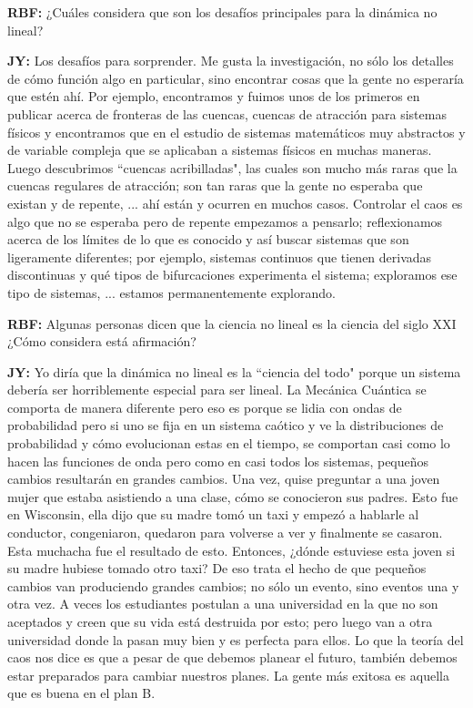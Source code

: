 \documentclass{rbf}
\newcommand{\mr}{{\bf RBF: }}
\newcommand{\jim}{{\bf JY: }}
\begin{document}
\mr ¿Cuáles considera que son los desafíos principales para la dinámica no lineal?

\jim Los desafíos para sorprender. Me gusta la investigación, no sólo los detalles de cómo función algo en particular, sino encontrar cosas que la gente no esperaría que estén ahí. Por ejemplo, encontramos y fuimos unos de los primeros en publicar acerca de fronteras de las cuencas, cuencas de atracción para sistemas físicos y encontramos que en el estudio de sistemas matemáticos muy abstractos y de variable compleja que se aplicaban a sistemas físicos en muchas maneras. Luego descubrimos ``cuencas acribilladas", las cuales son mucho más raras que la cuencas regulares de atracción; son tan raras que la gente no esperaba que existan y de repente, ... ahí están y ocurren en muchos casos. Controlar el caos es algo que no se esperaba pero de repente empezamos a pensarlo; reflexionamos acerca de los límites de lo que es conocido y así buscar sistemas que son ligeramente diferentes; por ejemplo, sistemas continuos que tienen derivadas discontinuas
y qué tipos de bifurcaciones experimenta el sistema; exploramos ese tipo de sistemas, ... estamos permanentemente explorando.

\mr Algunas personas dicen que la ciencia no lineal es la ciencia del siglo XXI ¿Cómo considera está afirmación?

\jim Yo diría que la dinámica no lineal es la ``ciencia del todo" porque un sistema debería ser horriblemente especial para ser lineal. La Mecánica Cuántica se comporta de manera diferente pero eso es porque se lidia con ondas de probabilidad pero si uno se fija en un sistema caótico y ve la distribuciones de probabilidad y cómo evolucionan estas en el tiempo, se comportan casi como lo hacen las funciones de onda pero como en casi todos los sistemas, pequeños cambios resultarán en grandes cambios. Una vez, quise preguntar a una joven mujer
que estaba asistiendo a una clase, cómo se conocieron sus padres. Esto fue en Wisconsin, ella dijo que su madre tomó un taxi y empezó a hablarle al conductor, congeniaron, quedaron para volverse a ver y finalmente se casaron. Esta muchacha fue el resultado de esto. Entonces, ¿dónde estuviese esta joven si su madre hubiese tomado otro taxi? De eso trata el hecho de que pequeños cambios van produciendo grandes cambios; no sólo un evento, sino eventos una y otra vez. A veces los estudiantes postulan a una universidad en la que no son aceptados y creen que su vida está destruida por esto; pero luego van a otra universidad donde la pasan muy bien y es perfecta para ellos. Lo que la teoría del caos nos dice es que a pesar de que debemos planear el futuro, también debemos estar preparados para cambiar nuestros planes. La gente más exitosa es aquella que es buena en el plan B.
\end{document}
